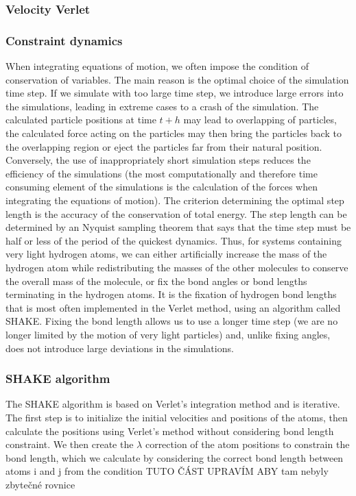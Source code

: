 \subsubsection{Velocity Verlet}

\subsubsection{Constraint dynamics}

When integrating equations of motion, we often impose the condition of conservation of variables. The main reason is the optimal choice of the simulation time step. If we simulate with too large time step, we introduce large errors into the simulations, leading in extreme cases to a crash of the simulation. The calculated particle positions at time $t+h$ may lead to overlapping of particles, the calculated force acting on the particles may then bring the particles back to the overlapping region or eject the particles far from their natural position. Conversely, the use of inappropriately short simulation steps reduces the efficiency of the simulations (the most computationally and therefore time consuming element of the simulations is the calculation of the forces when integrating the equations of motion). The criterion determining the optimal step length is the accuracy of the conservation of total energy. The step length can be determined by an Nyquist sampling theorem that says that the time step must be half or less of the period of the quickest dynamics. Thus, for systems containing very light hydrogen atoms, we can either artificially increase the mass of the hydrogen atom while redistributing the masses of the other molecules to conserve the overall mass of the molecule, or fix the bond angles or bond lengths terminating in the hydrogen atoms. It is the fixation of hydrogen bond lengths that is most often implemented in the Verlet method, using an algorithm called SHAKE. Fixing the bond length allows us to use a longer time step (we are no longer limited by the motion of very light particles) and, unlike fixing angles, does not introduce large deviations in the simulations.

\subsubsection{SHAKE algorithm}

The SHAKE algorithm is based on Verlet's integration method and is iterative. The first step is to initialize the initial velocities and positions of the atoms, then calculate the positions using Verlet's method without considering bond length constraint. We then create the $\lambda$ correction of the atom positions to constrain the bond length, which we calculate by considering the correct bond length between atoms i and j from the condition 
TUTO ČÁST UPRAVÍM ABY tam nebyly zbytečné rovnice

